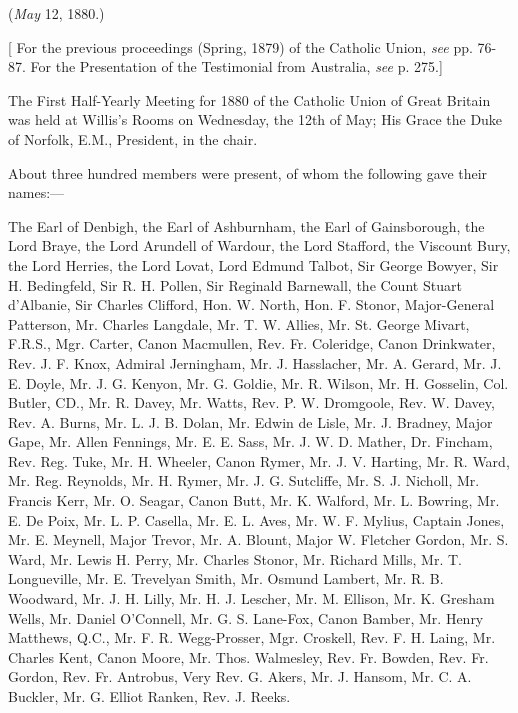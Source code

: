 
(\emph{May} 12, 1880.)

[ For the previous proceedings (Spring, 1879) of the Catholic
Union, \emph{see} pp. 76-87. For the Presentation of the Testimonial
from Australia, \emph{see} p. 275.]

The First Half-Yearly Meeting for 1880 of the
Catholic Union of Great Britain was held at Willis’s Rooms on
Wednesday, the 12th of May; His Grace the Duke of Norfolk, E.M.,
President, in the chair.

About three hundred members were present, of whom
the following gave their names:—

The Earl of Denbigh, the Earl of Ashburnham, the Earl of
Gainsborough, the Lord Braye, the Lord Arundell of Wardour, the Lord
Stafford, the Viscount Bury, the Lord Herries, the Lord Lovat, Lord
Edmund Talbot, Sir George Bowyer, Sir H. Bedingfeld, Sir R. H. Pollen,
Sir Reginald Barnewall, the Count Stuart d’Albanie, Sir Charles
Clifford, Hon. W. North, Hon. F. Stonor, Major-General Patterson, Mr.
Charles Langdale, Mr. T. W. Allies, Mr. St. George Mivart, F.R.S.,
Mgr. Carter, Canon Macmullen, Rev. Fr. Coleridge, Canon Drinkwater,
Rev. J. F. Knox, Admiral Jerningham, Mr. J. Hasslacher, Mr. A. Gerard,
Mr. J. E. Doyle, Mr. J. G. Kenyon, Mr. G. Goldie, Mr. R. Wilson, Mr.
H. Gosselin, Col. Butler, CD., Mr. R. Davey, Mr. Watts, Rev. P. W.
Dromgoole, Rev. W. Davey, Rev. A. Burns, Mr. L. J. B. Dolan, Mr. Edwin
de Lisle, Mr. J. Bradney, Major Gape, Mr. Allen Fennings, Mr. E. E.
Sass, Mr. J. W. D. Mather, Dr. Fincham, Rev. Reg. Tuke, Mr. H.
Wheeler, Canon Rymer, Mr. J. V. Harting, Mr. R. Ward, Mr. Reg.
Reynolds, Mr. H. Rymer, Mr. J. G. Sutcliffe, Mr. S. J. Nicholl, Mr.
Francis Kerr, Mr. O. Seagar, Canon Butt, Mr. K. Walford, Mr. L.
Bowring, Mr. E. De Poix, Mr. L. P. Casella, Mr. E. L. Aves, Mr. W. F.
Mylius, Captain Jones, Mr. E. Meynell, Major Trevor, Mr. A. Blount,
Major W. Fletcher Gordon, Mr. S. Ward, Mr. Lewis H. Perry, Mr. Charles
Stonor, Mr. Richard Mills, Mr. T. Longueville, Mr. E. Trevelyan Smith,
Mr. Osmund Lambert, Mr. R. B. Woodward, Mr. J. H. Lilly, Mr. H. J.
Lescher, Mr. M. Ellison, Mr. K. Gresham Wells, Mr. Daniel O’Connell,
Mr. G. S. Lane-Fox, Canon Bamber, Mr. Henry Matthews, Q.C., Mr. F. R.
Wegg-Prosser, Mgr. Croskell, Rev. F. H. Laing, Mr. Charles Kent, Canon
Moore, Mr. Thos. Walmesley, Rev. Fr. Bowden, Rev. Fr. Gordon, Rev. Fr.
Antrobus, Very Rev. G. Akers, Mr. J. Hansom, Mr. C. A. Buckler, Mr. G.
Elliot Ranken, Rev. J. Reeks.

